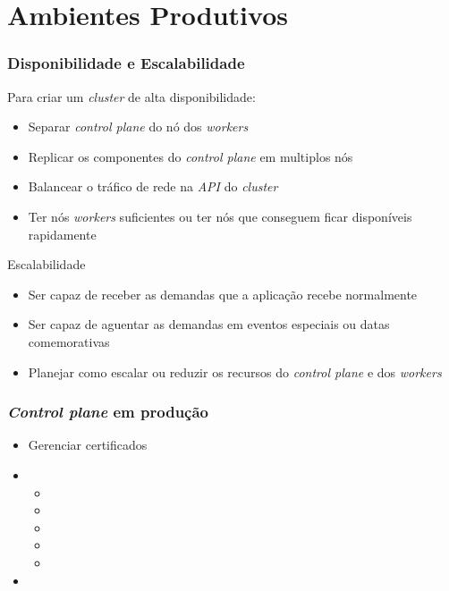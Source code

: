 \section{Ambientes Produtivos}

\begin{frame}
\frametitle{Disponibilidade e Escalabilidade}

Para criar um \textit{cluster} de alta disponibilidade:

\begin{itemize}
	\item Separar \textit{control plane} do nó dos \textit{workers}
	\item Replicar os componentes do \textit{control plane} em multiplos nós
	\item Balancear o tráfico de rede na \textit{API} do \textit{cluster}
	\item Ter nós \textit{workers} suficientes ou ter nós que conseguem ficar disponíveis rapidamente
\end{itemize}

Escalabilidade

\begin{itemize}
	\item Ser capaz de receber as demandas que a aplicação recebe normalmente
	\item Ser capaz de aguentar as demandas em eventos especiais ou datas comemorativas
	\item Planejar como escalar ou reduzir os recursos do \textit{control plane} e dos \textit{workers}
\end{itemize}
\end{frame}

\begin{frame}
\frametitle{\textit{Control plane} em produção}
\begin{itemize}
	\item Gerenciar certificados
	\item {}
		\begin{itemize}
			\item {}
			\item {}
			\item {}
			\item {}
			\item {}
		\end{itemize}
	\item 
\end{itemize}
\end{frame}

